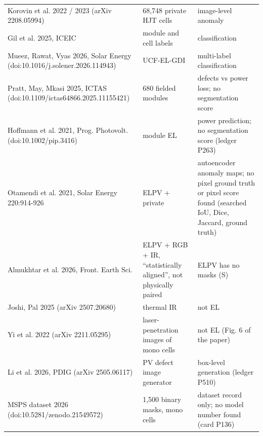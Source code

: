 \begin{table}[ht]
\begin{tabular}{>{\raggedright\hspace{0pt}}p{5.2cm} >{\raggedright\hspace{0pt}}p{4.2cm} >{\raggedright\arraybackslash\hspace{0pt}}p{5.4cm}}
Korovin et al. 2022 / 2023 (arXiv 2208.05994) & 68,748 private HJT cells & image-level anomaly \\
Gil et al. 2025, ICEIC & module and cell labels & classification \\
Mueez, Rawat, Vyas 2026, Solar Energy (doi:\allowbreak{}10.\allowbreak{}1016/\allowbreak{}j.\allowbreak{}solener.\allowbreak{}2026.\allowbreak{}114943) & UCF-EL-GDI & multi-label classification \\
Pratt, May, Mkasi 2025, ICTAS (doi:\allowbreak{}10.\allowbreak{}1109/\allowbreak{}ictas64866.\allowbreak{}2025.\allowbreak{}11155421) & 680 fielded modules & defects vs power loss; no segmentation score \\
Hoffmann et al. 2021, Prog. Photovolt. (doi:\allowbreak{}10.\allowbreak{}1002/\allowbreak{}pip.\allowbreak{}3416) & module EL & power prediction; no segmentation score (ledger P263) \\
Otamendi et al. 2021, Solar Energy 220:914-926 & ELPV + private & autoencoder anomaly maps; no pixel ground truth or pixel score found (searched IoU, Dice, Jaccard, ground truth) \\
Almukhtar et al. 2026, Front. Earth Sci. & ELPV + RGB + IR, ``statistically aligned'', not physically paired & ELPV has no masks (S) \\
Joshi, Pal 2025 (arXiv 2507.20680) & thermal IR & not EL \\
Yi et al. 2022 (arXiv 2211.05295) & laser-penetration images of mono cells & not EL (Fig. 6 of the paper) \\
Li et al. 2026, PDIG (arXiv 2505.06117) & PV defect image generator & box-level generation (ledger P510) \\
MSPS dataset 2026 (doi:\allowbreak{}10.\allowbreak{}5281/\allowbreak{}zenodo.\allowbreak{}21549572) & 1,500 binary masks, mono cells & dataset record only; no model number found (card P136) \\
\bottomrule
\end{tabular}
\end{table}

